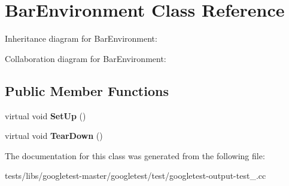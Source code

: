 \hypertarget{classBarEnvironment}{}\section{Bar\+Environment Class Reference}
\label{classBarEnvironment}


Inheritance diagram for Bar\+Environment\+:


Collaboration diagram for Bar\+Environment\+:
\subsection*{Public Member Functions}
\begin{DoxyCompactItemize}
\item 
\mbox{\label{classBarEnvironment_a88e17c5dd1dcea7a4538f2f3c6bf7bdd}} 
virtual void {\bfseries Set\+Up} ()
\item 
\mbox{\label{classBarEnvironment_a384f951da72a2a18bb0c2b3506376b09}} 
virtual void {\bfseries Tear\+Down} ()
\end{DoxyCompactItemize}


The documentation for this class was generated from the following file\+:\begin{DoxyCompactItemize}
\item 
tests/libs/googletest-\/master/googletest/test/googletest-\/output-\/test\+\_\+.\+cc\end{DoxyCompactItemize}
